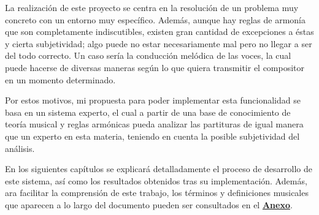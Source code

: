 La realización de este proyecto se centra en la resolución de un problema muy concreto con un entorno muy específico. Además, aunque hay reglas de armonía que son completamente indiscutibles, existen gran cantidad de excepciones a éstas y cierta subjetividad; algo puede no estar necesariamente mal pero no llegar a ser del todo correcto. Un caso sería la conducción melódica de las voces, la cual puede hacerse de diversas maneras según lo que quiera transmitir el compositor en un momento determinado.

Por estos motivos, mi propuesta para poder implementar esta funcionalidad se basa en un sistema experto, el cual a partir de una base de conocimiento de teoría musical y reglas armónicas pueda analizar las partituras de igual manera que un experto en esta materia, teniendo en cuenta la posible subjetividad del análisis.

En los siguientes capítulos se explicará detalladamente el proceso de desarrollo de este sistema, así como los resultados obtenidos tras su implementación. Además, ara facilitar la comprensión de este trabajo, los términos y definiciones musicales que aparecen a lo largo del documento pueden ser consultados en el \hyperref[glosario]{\textbf{Anexo}}.

